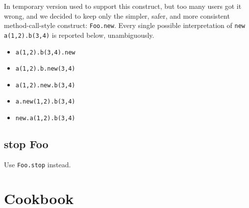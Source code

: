 In temporary version  used to support this  construct,
but too many users got it wrong, and we decided to keep only the
simpler, safer, and more consistent method-call-style construct:
\lstinline{Foo.new}.  Every single possible interpretation of
\lstinline{new a(1,2).b(3,4)} is reported below, unambiguously.
\begin{itemize}
\item \lstinline{a(1,2).b(3,4).new}
\item \lstinline{a(1,2).b.new(3,4)}
\item \lstinline{a(1,2).new.b(3,4)}
\item \lstinline{a.new(1,2).b(3,4)}
\item \lstinline{new.a(1,2).b(3,4)}
\end{itemize}

\subsection{stop Foo}

Use \lstinline{Foo.stop} instead.

\section{Cookbook}



